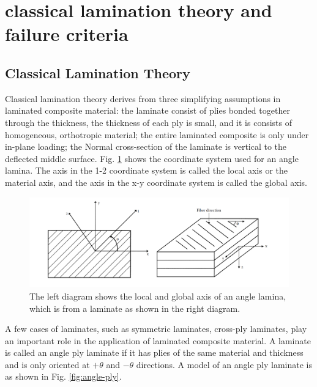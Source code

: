 \section{classical lamination theory and failure criteria}

\subsection{Classical Lamination Theory}


Classical lamination theory derives from three simplifying assumptions in
laminated composite material: the laminate consist of plies bonded together
through the thickness, the thickness of each ply is small, and it is consists of
homogeneous, orthotropic material; the entire laminated composite is only under
in-plane loading; the Normal cross-section of the laminate is vertical to the
deflected middle surface. Fig. \ref{fig:lamina_local_and_global} shows the
coordinate system used for an angle lamina. The axis in the 1-2 coordinate
system is called the local axis or the material axis, and the axis in the x-y
coordinate system is called the global axis.

\begin{figure}[b]
	\includegraphics[width=1\linewidth]{fig/lamina_local_global_axes.png}
	\caption{The left diagram shows the local and global axis of an angle lamina, which is from a laminate as shown in the right diagram.}
	\label{fig:lamina_local_and_global}
\end{figure}

A few cases of laminates, such as symmetric laminates, cross-ply laminates, play
an important role in the application of laminated composite material. A laminate
is called an angle ply laminate if it has plies of the same material and
thickness and is only oriented at $+\theta$ and $-\theta$ directions. A model of
an angle ply laminate is as shown in Fig. \ref{fig:angle-ply}.



